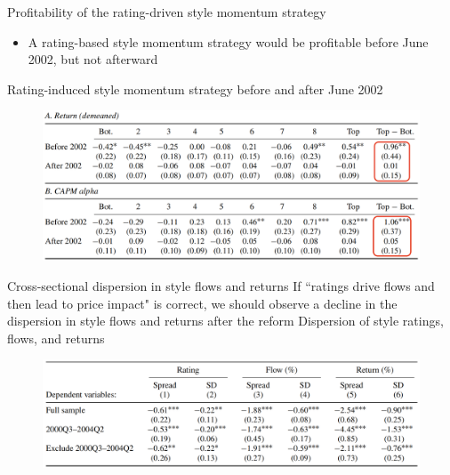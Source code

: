 \documentclass[UTF8, 16pt]{beamer}
\begin{document}
\begin{CJK*}{UTF8}{gbsn}
\begin{frame}{Profitability of the rating-driven style momentum strategy}
	\begin{itemize}
		\item A rating-based style momentum strategy would be \alert{profitable} before June 2002, but not afterward
	\end{itemize}
	\center\tiny{Rating-induced style momentum strategy before and after June 2002}
	\vspace{-0.3cm}
	\begin{figure}[htpb]
	  \begin{center}
	    \includegraphics[width=1  \linewidth]
	    {pic/style_momentum_strategy.png}
	  \end{center}
	\end{figure}
\end{frame}

\begin{frame}{Cross-sectional dispersion in style flows and returns}
	If ``ratings drive flows and then lead to price impact" is correct, we should observe \alert{a decline in the dispersion} in style flows and returns after the reform
	\center\tiny{Dispersion of style ratings, flows, and returns}
	\vspace{-0.3cm}
	\begin{figure}[htpb]
	  \begin{center}
	    \includegraphics[width=1  \linewidth]
	    {pic/dispersion.png}
	  \end{center}
	\end{figure}
\end{frame}


\end{CJK*}
\end{document}
